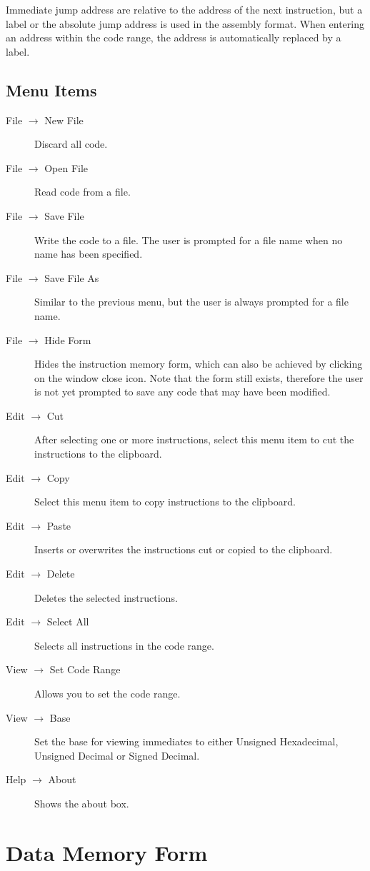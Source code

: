 \documentclass{article}
\begin{document}
Immediate jump address are relative to the address of the next 
instruction, but a label or the absolute jump address is used in the 
assembly format. When entering an address within the code range, the 
address is automatically replaced by a label.

\subsection{Menu Items}

\begin{description}
\item[File $\to$ New File] Discard all code.
\item[File $\to$ Open File] Read code from a file. 
\item[File $\to$ Save File] Write the code to a file. The user is prompted for a file name when no name has been specified.
\item[File $\to$ Save File As] Similar to the previous menu, but the user is always prompted for a file name.
\item[File $\to$ Hide Form] Hides the instruction 
memory form, which can also be achieved by clicking on the window close 
icon. Note that the form still exists, therefore the user is not yet 
prompted to save any code that may have been modified.
\item[Edit $\to$ Cut] After selecting one or more instructions, select this menu item to cut the instructions to the clipboard.
\item[Edit $\to$ Copy] Select this menu item to copy instructions to the clipboard.
\item[Edit $\to$ Paste] Inserts or overwrites the instructions cut or copied to the clipboard.
\item[Edit $\to$ Delete] Deletes the selected instructions.
\item[Edit $\to$ Select All] Selects all instructions in the code range.
\item[View $\to$ Set Code Range] Allows you to set the code range.
\item[View $\to$ Base] Set the base for viewing immediates to either Unsigned Hexadecimal, Unsigned Decimal or Signed Decimal.
\item[Help $\to$ About] Shows the about box.
\end{description}

\section{Data Memory Form}
\end{document}
